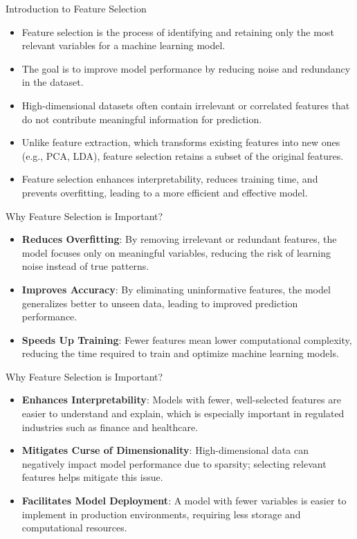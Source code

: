 \documentclass[11pt]{beamer}
\begin{document}
\begin{frame}{Introduction to Feature Selection}
    \begin{itemize}
        \item Feature selection is the process of identifying and retaining only the most relevant variables for a machine learning model.
        \item The goal is to improve model performance by reducing noise and redundancy in the dataset.
        \item High-dimensional datasets often contain irrelevant or correlated features that do not contribute meaningful information for prediction.
        \item Unlike feature extraction, which transforms existing features into new ones (e.g., PCA, LDA), feature selection retains a subset of the original features.
        \item Feature selection enhances interpretability, reduces training time, and prevents overfitting, leading to a more efficient and effective model.
    \end{itemize}
\end{frame}

\begin{frame}{Why Feature Selection is Important?}
    \begin{itemize}
        \item \textbf{Reduces Overfitting}: By removing irrelevant or redundant features, the model focuses only on meaningful variables, reducing the risk of learning noise instead of true patterns.
        \item \textbf{Improves Accuracy}: By eliminating uninformative features, the model generalizes better to unseen data, leading to improved prediction performance.
        \item \textbf{Speeds Up Training}: Fewer features mean lower computational complexity, reducing the time required to train and optimize machine learning models.
   \end{itemize}     
\end{frame}

\begin{frame}{Why Feature Selection is Important?}
    \begin{itemize}
        \item \textbf{Enhances Interpretability}: Models with fewer, well-selected features are easier to understand and explain, which is especially important in regulated industries such as finance and healthcare.
        \item \textbf{Mitigates Curse of Dimensionality}: High-dimensional data can negatively impact model performance due to sparsity; selecting relevant features helps mitigate this issue.
        \item \textbf{Facilitates Model Deployment}: A model with fewer variables is easier to implement in production environments, requiring less storage and computational resources.
    \end{itemize}
\end{frame}
\end{document}
